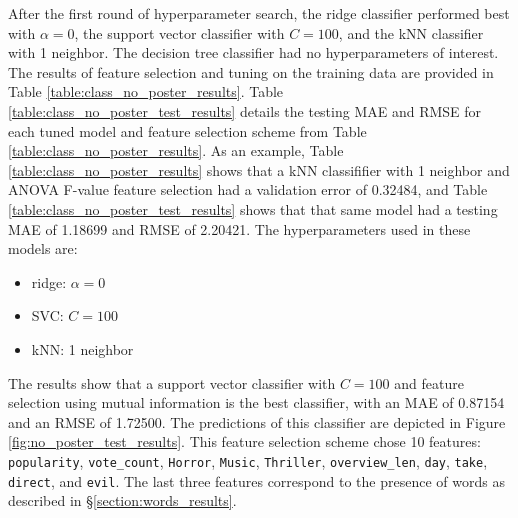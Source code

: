 \documentclass[12pt, oneside]{article}   	%
\begin{document}
After the first round of hyperparameter search, the ridge classifier performed best with $\alpha=0$, the support vector classifier with $C=100$, and the kNN classifier with 1 neighbor. The decision tree classifier had no hyperparameters of interest. The results of feature selection and tuning on the training data are provided in Table \ref{table:class_no_poster_results}. Table \ref{table:class_no_poster_test_results} details the testing MAE and RMSE for each tuned model and feature selection scheme from Table \ref{table:class_no_poster_results}. As an example, Table \ref{table:class_no_poster_results} shows that a kNN classififier with 1 neighbor and ANOVA F-value feature selection had a validation error of 0.32484, and Table \ref{table:class_no_poster_test_results} shows that that same model had a testing MAE of 1.18699 and RMSE of 2.20421. The hyperparameters used in these models are:

\begin{itemize}
\item ridge: $\alpha=0$
\item SVC: $C=100$
\item kNN: 1 neighbor
\end{itemize}

The results show that a support vector classifier with $C=100$ and feature selection using mutual information is the best classifier, with an MAE of 0.87154 and an RMSE of 1.72500. The predictions of this classifier are depicted in Figure \ref{fig:no_poster_test_results}. This feature selection scheme chose 10 features: \texttt{popularity}, \texttt{vote\_count}, \texttt{Horror}, \texttt{Music}, \texttt{Thriller}, \texttt{overview\_len}, \texttt{day}, \texttt{take}, \texttt{direct}, and \texttt{evil}. The last three features correspond to the presence of words as described in \S \ref{section:words_results}.

\begin{table}
\caption{\label{table:class_no_poster_results}Results of feature selection and hyperparameter tuning without posters.}
\end{table}
\end{document}
